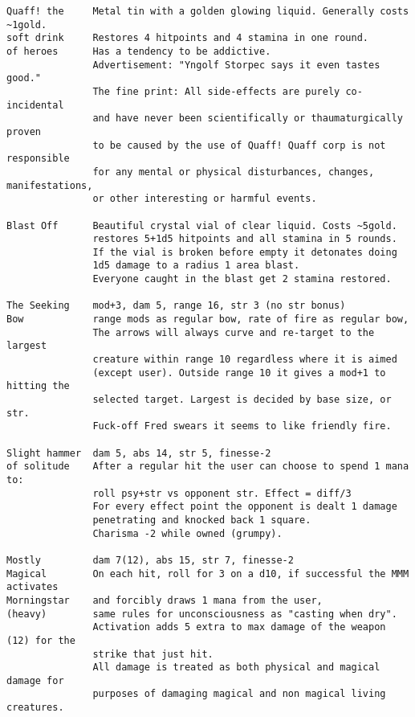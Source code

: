 \small \begin{verbatim}
Quaff! the     Metal tin with a golden glowing liquid. Generally costs ~1gold.
soft drink     Restores 4 hitpoints and 4 stamina in one round.
of heroes      Has a tendency to be addictive.
               Advertisement: "Yngolf Storpec says it even tastes good."
               The fine print: All side-effects are purely co-incidental
               and have never been scientifically or thaumaturgically proven
               to be caused by the use of Quaff! Quaff corp is not responsible
               for any mental or physical disturbances, changes, manifestations,
               or other interesting or harmful events.

Blast Off      Beautiful crystal vial of clear liquid. Costs ~5gold.
               restores 5+1d5 hitpoints and all stamina in 5 rounds.
               If the vial is broken before empty it detonates doing
               1d5 damage to a radius 1 area blast.
               Everyone caught in the blast get 2 stamina restored.

The Seeking    mod+3, dam 5, range 16, str 3 (no str bonus)
Bow            range mods as regular bow, rate of fire as regular bow,
               The arrows will always curve and re-target to the largest 
               creature within range 10 regardless where it is aimed 
               (except user). Outside range 10 it gives a mod+1 to hitting the
               selected target. Largest is decided by base size, or str.
               Fuck-off Fred swears it seems to like friendly fire.

Slight hammer  dam 5, abs 14, str 5, finesse-2
of solitude    After a regular hit the user can choose to spend 1 mana to:
               roll psy+str vs opponent str. Effect = diff/3
               For every effect point the opponent is dealt 1 damage
               penetrating and knocked back 1 square.
               Charisma -2 while owned (grumpy).

Mostly         dam 7(12), abs 15, str 7, finesse-2
Magical        On each hit, roll for 3 on a d10, if successful the MMM activates
Morningstar    and forcibly draws 1 mana from the user,
(heavy)        same rules for unconsciousness as "casting when dry".
               Activation adds 5 extra to max damage of the weapon (12) for the
               strike that just hit.
               All damage is treated as both physical and magical damage for
               purposes of damaging magical and non magical living creatures.


\end{verbatim}
